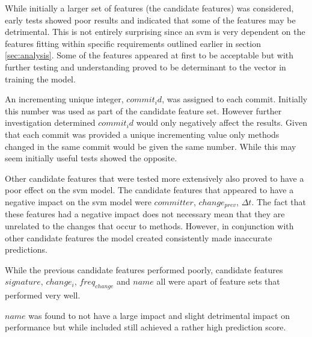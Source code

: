 


While initially a larger set of features (the candidate features) was considered, early tests showed poor results and indicated that some of the features may be detrimental. This is not entirely surprising since an \gls{svm} is very dependent on the features fitting within specific requirements outlined earlier in section \ref{sec:analysis}. Some of the features appeared at first to be acceptable but with further testing and understanding proved to be determinant to the vector in training the model.

An incrementing unique integer, $commit_id$, was assigned to each commit. Initially this number was used as part of the candidate feature set. However further investigation determined $commit_id$ would only negatively affect the results. Given that each commit was provided a unique incrementing value only methods changed in the same commit would be given the same number. While this may seem initially useful tests showed the opposite. %

Other candidate features that were tested more extensively also proved to have a poor effect on the \gls{svm} model. The candidate features that appeared to have a negative impact on the \gls{svm} model were $committer$, $change_{prev}$, $\Delta t$. The fact that these features had a negative impact does not necessary mean that they are unrelated to the changes that occur to methods. However, in conjunction with other candidate features the model created consistently made inaccurate predictions.


While the previous candidate features performed poorly, candidate features $signature$, $change_i$, $freq_{change}$ and $name$ all were apart of feature sets that performed very well. 

$name$ was found to not have a large impact and slight detrimental impact on performance but while included still achieved a rather high prediction score. 


